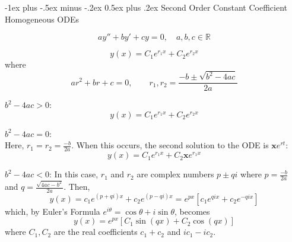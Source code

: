 \documentclass[10pt,landscape,letterpaper]{article}
\makeatletter
\renewcommand{\section}{\@startsection{section}{1}{0mm}%
                                {-1ex plus -.5ex minus -.2ex}%
                                {0.5ex plus .2ex}%
                                {\normalfont\large\bfseries}}
\newcommand\cheatsheetmargin{0.2cm}
\makeatother
\begin{document}
\begin{multicols}{3}
\section{Second Order Constant Coefficient Homogeneous ODEs}

\begin{description}[style=unboxed,leftmargin=\cheatsheetmargin]
    \item[Form:] \begin{equation*}ay'' + by' + cy = 0, \quad a,b,c \in \mathbb{R}\end{equation*}
    \item[Solved by:]
        \begin{equation*}
        y(x) = C_1 e^{r_1 x} + C_2 e^{r_2 x}
        \end{equation*}
        where
         \begin{equation*} ar^2 + br + c = 0 , \qquad
        r_1, r_2 = \frac{-b \pm \sqrt{b^2 - 4ac}}{2a}
        \end{equation*}
       
    \item[Case 1.] $b^2 - 4ac > 0$:
        \begin{equation*}
            \boxed{y(x) = C_1 e^{r_1 x} + C_2 e^{r_2 x}}
        \end{equation*}
    \item[Case 2.] $b^2 - 4ac =0$:\\
    Here, $r_1 = r_2 = \frac{-b}{2a}.$ When this occurs, the second solution to the ODE is $\mathbf{x}e^{rt}$:
        \begin{equation*}
            \boxed{y(x) = C_1 e^{r_1 x} + C_2 \mathbf{x}e^{r_1 x}}
        \end{equation*}
    \item[Case 3.] $b^2 - 4ac < 0$:
        In this case, $r_1$ and $r_2$ are complex numbers $p \pm qi$ where $p = \frac{-b}{2a}$ and $q = \frac{\sqrt{4ac - b^2 }}{2a}$. Then,
        \begin{equation*}
        y(x)= c_1e^{(p+qi)x} + c_2 e^{(p-qi) x} = e^{px} \left[c_1 e^{qix} + c_2 e^{-qix}\right]
        \end{equation*}
        which, by Euler's Formula $e^{i\theta} = \cos \theta + i \sin \theta$, becomes
         \begin{equation*}
         \boxed{
             y(x) = e^{px} \left[C_1 \sin \left(qx\right) + C_2 \cos \left(qx\right) \right]
         }
         \end{equation*}
         where $C_1, C_2$ are the real coefficients $c_1 + c_2$ and $ic_1 - ic_2$.
         

\end{description}
\end{multicols}
\end{document}
